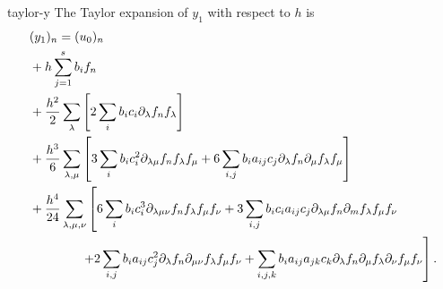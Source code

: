 \begin{Lemma}{taylor-y}
The Taylor expansion of $y_1$ with respect to $h$ is
  \begin{gather}
    \label{eq:taylor-y:1}
    \begin{split}
      &(y_1)_n = (u_0)_n
      \\& + h \sum_{j=1}^s b_i f_n
      \\& + \frac{h^2}2 \sum_{\lambda} \left[2\sum_{i} b_i c_i
        \partial_{\lambda} f_n f_\lambda\right]
      \\& + \frac{h^3}6 \sum_{\lambda,\mu} \left[
        3\sum_{i} b_i c_i^2
        \partial_{\lambda\mu} f_n f_\lambda f_\mu
        + 6 \sum_{i,j} b_i a_{ij} c_j
        \partial_{\lambda} f_n \partial_\mu f_\lambda f_\mu
      \right]
      \\& + \frac{h^4}{24} \sum_{\lambda,\mu,\nu} \left[
        6 \sum_{i} b_i c_i^3
        \partial_{\lambda\mu\nu} f_n f_\lambda f_\mu f_\nu
      + 3 \sum_{i,j} b_i c_i a_{ij} c_j\partial_{\lambda\mu} f_n \partial_{m}f_\lambda f_\mu f_\nu
        \right.
      \\&\hphantom{+\frac{h^4}{24} \sum_{\lambda,\mu,\nu}} \left.
      + 2 \sum_{i,j} b_i a_{ij} c_j^2\partial_{\lambda}f_n \partial_{\mu\nu} f_\lambda f_\mu f_\nu
      + \sum_{i,j,k} b_i a_{ij} a_{jk} c_k \partial_{\lambda}f_n \partial_{\mu} f_\lambda \partial_{\nu}
      f_\mu f_\nu
      \right].
    \end{split}
  \end{gather}
\end{Lemma}

